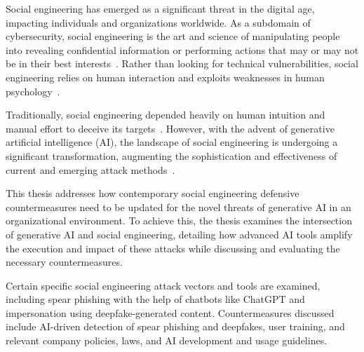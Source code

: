 %
%
Social engineering has emerged as a significant threat in the digital age, impacting individuals and organizations worldwide. As a subdomain of cybersecurity, social engineering is the art and science of manipulating people into revealing confidential information or performing actions that may or may not be in their best interests~\citep{hadnagy_Social_Engineering_The_Science_2018}. Rather than looking for technical vulnerabilities, social engineering relies on human interaction and exploits weaknesses in human psychology~\citep{wang_Defining_Social_Engineering_2020}.





%
%
Traditionally, social engineering depended heavily on human intuition and manual effort to deceive its targets~\citep{mitnick_The_Art_of_Deception_2003, mirsky_Threat_Offensive_AI_Organizations_2023}. However, with the advent of generative artificial intelligence (AI), the landscape of social engineering is undergoing a significant transformation, augmenting the sophistication and effectiveness of current and emerging attack methods~\citep{fakhouri_AI_Driven_Solutions_SE_Attacks_2024}.







%
%
This thesis addresses how contemporary social engineering defensive countermeasures need to be updated for the novel threats of generative AI in an organizational environment. To achieve this, the thesis examines the intersection of generative AI and social engineering, detailing how advanced AI tools amplify the execution and impact of these attacks while discussing and evaluating the necessary countermeasures.





%
%
Certain specific social engineering attack vectors and tools are examined, including spear phishing with the help of chatbots like ChatGPT and impersonation using deepfake-generated content. Countermeasures discussed include AI-driven detection of spear phishing and deepfakes, user training, and relevant company policies, laws, and AI development and usage guidelines.





